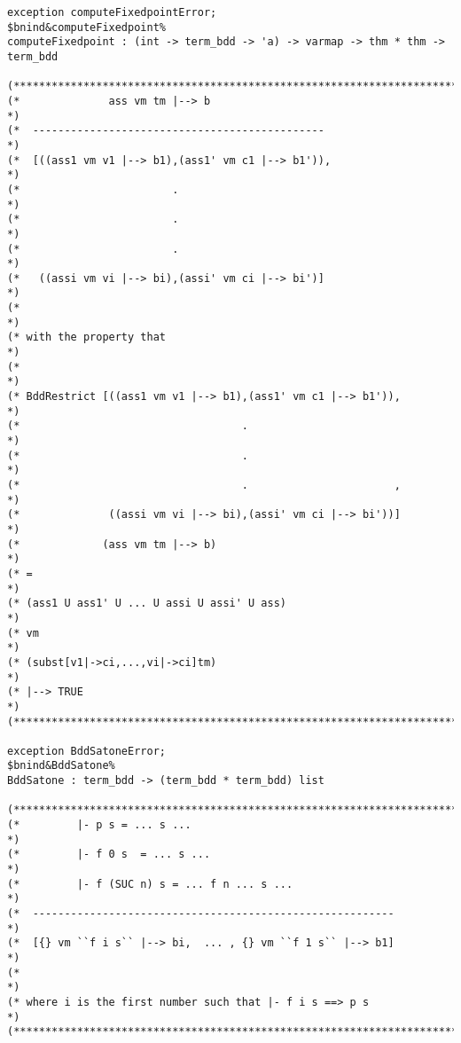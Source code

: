 \documentclass[12pt]{article}
\begin{document}
\begin{footnotesize}
\begin{Verbatim}[commandchars=\$\&\%]
exception computeFixedpointError;
$bnind&computeFixedpoint%
computeFixedpoint : (int -> term_bdd -> 'a) -> varmap -> thm * thm -> term_bdd

(*****************************************************************************)
(*              ass vm tm |--> b                                             *)
(*  ----------------------------------------------                           *)
(*  [((ass1 vm v1 |--> b1),(ass1' vm c1 |--> b1')),                          *)
(*                        .                                                  *)
(*                        .                                                  *)
(*                        .                                                  *)
(*   ((assi vm vi |--> bi),(assi' vm ci |--> bi')]                           *)
(*                                                                           *)
(* with the property that                                                    *)
(*                                                                           *)
(* BddRestrict [((ass1 vm v1 |--> b1),(ass1' vm c1 |--> b1')),               *)
(*                                   .                                       *)
(*                                   .                                       *)
(*                                   .                       ,               *)
(*              ((assi vm vi |--> bi),(assi' vm ci |--> bi'))]               *)
(*             (ass vm tm |--> b)                                            *)
(* =                                                                         *)
(* (ass1 U ass1' U ... U assi U assi' U ass)                                 *)
(* vm                                                                        *)
(* (subst[v1|->ci,...,vi|->ci]tm)                                            *)
(* |--> TRUE                                                                 *)
(*****************************************************************************)

exception BddSatoneError;
$bnind&BddSatone%
BddSatone : term_bdd -> (term_bdd * term_bdd) list

(*****************************************************************************)
(*         |- p s = ... s ...                                                *)
(*         |- f 0 s  = ... s ...                                             *)
(*         |- f (SUC n) s = ... f n ... s ...                                *)
(*  ---------------------------------------------------------                *)
(*  [{} vm ``f i s`` |--> bi,  ... , {} vm ``f 1 s`` |--> b1]                *)
(*                                                                           *)
(* where i is the first number such that |- f i s ==> p s                    *)
(*****************************************************************************)


\end{Verbatim}
\end{footnotesize}
\end{document}
